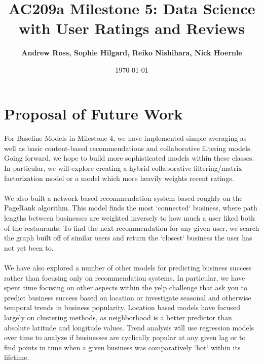 \documentclass[11pt]{article}
\title{
\vspace{1cm}
\textmd{\textbf{AC209a Milestone 5: Data Science with User Ratings and Reviews}}\\
}
\author{\textbf{Andrew Ross, Sophie Hilgard, Reiko Nishihara, Nick Hoernle}}
\date{\today} %
\begin{document}
\maketitle

\section*{Proposal of Future Work}
\paragraph{} 	For Baseline Models in Milestone 4, we have implemented simple averaging as well as basic content-based recommendations and collaborative filtering models. Going forward, we hope to build more sophisticated models within these classes. In particular, we will explore creating a hybrid collaborative filtering/matrix factorization model or a model which more heavily weights recent ratings.
\paragraph{}	We also built a network-based recommendation system based roughly on the PageRank algorithm. This model finds the most `connected` business, where path lengths between businesses are weighted inversely to how much a user liked both of the restaurants. To find the next recommendation for any given user, we search the graph built off of similar users and return the `closest` business the user has not yet been to.
\paragraph{}	We have also explored a number of other models for predicting business success rather than focusing only on recommendation systems. In particular, we have spent time focusing on other aspects within the yelp challenge that ask you to predict business success based on location or investigate seasonal and otherwise temporal trends in business popularity. Location based models have focused largely on clustering methods, as neighborhood is a better predictor than absolute latitude and longitude values. Trend analysis will use regression models over time to analyze if businesses are cyclically  popular at any given lag or to find points in time when a given business was comparatively `hot` within its lifetime.
	
\end{document}
